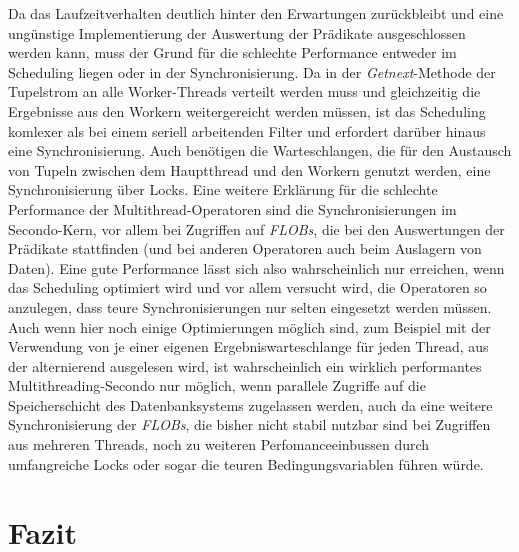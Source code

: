 \documentclass[a4paper,12pt,twoside]{article}
\newcommand{\Fb}[1]{\textit{#1}} %
\begin{document}
{Da das Laufzeitverhalten deutlich hinter den Erwartungen zurückbleibt und eine ungünstige Implementierung der Auswertung der Prädikate ausgeschlossen werden kann, muss der Grund für die schlechte Performance entweder im Scheduling liegen oder in der Synchronisierung. Da in der \Fb{Getnext}-Methode der Tupelstrom an alle Worker-Threads verteilt werden muss und gleichzeitig die Ergebnisse aus den Workern weitergereicht werden müssen, ist das Scheduling komlexer als bei einem seriell arbeitenden Filter und erfordert darüber hinaus eine Synchronisierung. Auch benötigen die Warteschlangen, die für den Austausch von Tupeln zwischen dem Hauptthread und den Workern genutzt werden, eine Synchronisierung über Locks. Eine weitere Erklärung für die schlechte Performance der Multithread-Operatoren sind die Synchronisierungen im Secondo-Kern, vor allem bei Zugriffen auf \Fb{FLOBs}, die bei den Auswertungen der Prädikate stattfinden (und bei anderen Operatoren auch beim Auslagern von Daten). Eine gute Performance lässt sich also wahrscheinlich nur erreichen, wenn das Scheduling optimiert wird und vor allem versucht wird, die Operatoren so anzulegen, dass teure Synchronisierungen nur selten eingesetzt werden müssen. Auch wenn hier noch einige Optimierungen möglich sind, zum Beispiel mit der Verwendung von je einer eigenen Ergebniswarteschlange für jeden Thread, aus der alternierend ausgelesen wird, ist wahrscheinlich ein wirklich performantes Multithreading-Secondo nur möglich, wenn parallele Zugriffe auf die Speicherschicht des Datenbanksystems zugelassen werden, auch da eine weitere Synchronisierung der \Fb{FLOBs}, die bisher nicht stabil nutzbar sind bei Zugriffen aus mehreren Threads, noch zu weiteren Perfomanceeinbussen durch umfangreiche Locks oder sogar die teuren Bedingungsvariablen führen würde. 

\section{Fazit}

}
\end{document}

